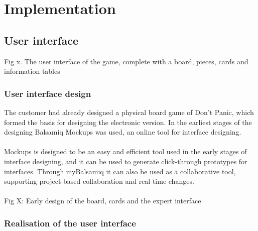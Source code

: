 \section{Implementation}

\subsection{User interface}
Fig x. The user interface of the game, complete with a board, pieces, cards and information tables







\subsubsection{User interface design}

The customer had already designed a physical board game of Don’t Panic, which formed the basis for designing the electronic version. In the earliest stages of the designing Balsamiq Mockups was used, an online tool for interface designing.\\
\\
Mockups is designed to be an easy and efficient tool used in the early stages of interface designing, and it can be used to generate click-through prototypes for interfaces. Through myBalsamiq it can also be used as a collaborative tool, supporting project-based collaboration and real-time changes.\\
\\ %
Fig X: Early design of the board, cards and the expert interface  

\subsubsection{Realisation of the user interface}

